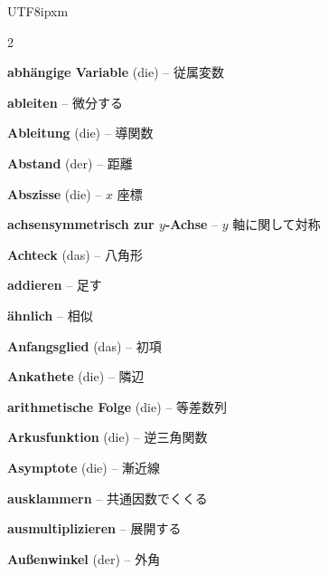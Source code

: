 \begin{CJK}{UTF8}{ipxm}
\begin{multicols}{2}
\par\nopagebreak
\textbf{abhängige Variable} (die) -- 従属変数\dotfill\hyperref[e:107]{\pageref*{e:107}}\par
\textbf{ableiten} -- 微分する\dotfill\hyperref[e:278]{\pageref*{e:278}}\par
\textbf{Ableitung} (die) -- 導関数\dotfill\hyperref[e:273]{\pageref*{e:273}}\par
\textbf{Abstand} (der) -- 距離\dotfill\hyperref[e:152]{\pageref*{e:152}}\par
\textbf{Abszisse} (die) -- $x$ 座標\dotfill\hyperref[e:117]{\pageref*{e:117}}\par
\textbf{achsensymmetrisch zur $y$-Achse} -- $y$ 軸に関して対称\dotfill\hyperref[e:144]{\pageref*{e:144}}\par
\textbf{Achteck} (das) -- 八角形\dotfill\hyperref[e:207]{\pageref*{e:207}}\par
\textbf{addieren} -- 足す\dotfill\hyperref[e:14]{\pageref*{e:14}}\par
\textbf{ähnlich} -- 相似\dotfill\hyperref[e:176]{\pageref*{e:176}}\par
\textbf{Anfangsglied} (das) -- 初項\dotfill\hyperref[e:261]{\pageref*{e:261}}\par
\textbf{Ankathete} (die) -- 隣辺\dotfill\hyperref[e:188]{\pageref*{e:188}}\par
\textbf{arithmetische Folge} (die) -- 等差数列\dotfill\hyperref[e:259]{\pageref*{e:259}}\par
\textbf{Arkusfunktion} (die) -- 逆三角関数\dotfill\hyperref[e:136]{\pageref*{e:136}}\par
\textbf{Asymptote} (die) -- 漸近線\dotfill\hyperref[e:271]{\pageref*{e:271}}\par
\textbf{ausklammern} -- 共通因数でくくる\dotfill\hyperref[e:92]{\pageref*{e:92}}\par
\textbf{ausmultiplizieren} -- 展開する\dotfill\hyperref[e:91]{\pageref*{e:91}}\par
\textbf{Außenwinkel} (der) -- 外角\dotfill\hyperref[e:179]{\pageref*{e:179}}\par


\end{multicols}
\end{CJK}
